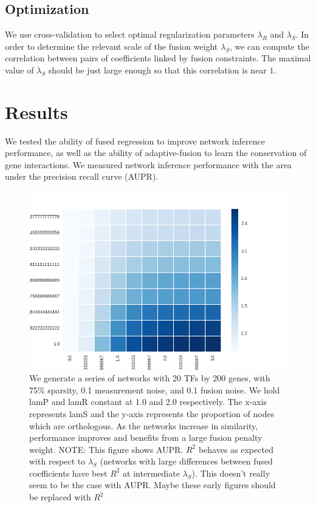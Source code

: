 \documentclass[11pt]{article}
\begin{document}
\subsection{Optimization}
We use cross-validation to select optimal regularization parameters $\lambda_R$ and $\lambda_S$. In order to determine the relevant scale of the fusion weight $\lambda_S$, we can compute the correlation between pairs of coefficients linked by fusion constraints. The maximal value of $\lambda_S$ should be just large enough so that this correlation is near $1$. 

\section{Results}
We tested the ability of fused regression to improve network inference performance, as well as the ability of adaptive-fusion to learn the conservation of gene interactions. We measured network inference performance with the area under the precision recall curve (AUPR). 

\begin{figure}
\begin{center}
  \includegraphics[scale=0.45]{l2fusionquick.png}
  \caption{\label{fig:figure1} We generate a series of networks with 20 TFs by 200 genes, with 75\% sparsity, 0.1 measurement noise, and 0.1 fusion noise. We hold lamP and lamR constant at 1.0 and 2.0 respectively. The x-axis represents lamS and the y-axis represents the proportion of nodes which are orthologous. As the networks increase in similarity, performance improves and benefits from a large fusion penalty weight. NOTE: This figure shows AUPR. $R^2$ behaves as expected with respect to $\lambda_S$ (networks with large differences between fused coefficients have best $R^2$ at intermediate $\lambda_S$). This doesn't really seem to be the case with AUPR. Maybe these early figures should be replaced with $R^2$}
  \end{center}
\end{figure}
\end{document}
